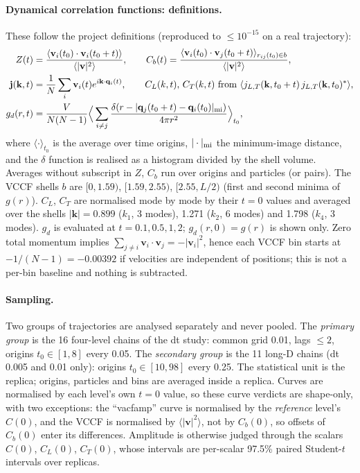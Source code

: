 \documentclass[11pt]{article}
\DeclareRobustCommand{\_}{\textunderscore\allowbreak}
\theoremstyle{remark}
\theoremstyle{definition}
\newcommand{\bq}{\mathbf{q}}
\newcommand{\bk}{\mathbf{k}}
\newcommand{\bv}{\mathbf{v}}
\begin{document}
\paragraph{Dynamical correlation functions: definitions.}
These follow the project definitions (reproduced to $\le10^{-15}$ on a real trajectory):
\begin{align}
Z(t)&=\frac{\langle\bv_i(t_0)\cdot\bv_i(t_0+t)\rangle}{\langle|\bv|^2\rangle},\qquad
C_b(t)=\frac{\langle\bv_i(t_0)\cdot\bv_j(t_0+t)\rangle_{r_{ij}(t_0)\in b}}{\langle|\bv|^2\rangle},\\
\mathbf j(\bk,t)&=\frac1N\sum_i\bv_i(t)e^{i\bk\cdot\bq_i(t)},\qquad
C_{L}(k,t),\,C_T(k,t)\ \text{from}\ \langle j_{L,T}(\bk,t_0+t)\,j_{L,T}(\bk,t_0)^*\rangle,\\
g_d(r,t)&=\frac{V}{N(N-1)}\Big\langle\sum_{i\neq j}\frac{\delta(r-|\bq_j(t_0+t)-\bq_i(t_0)|_{\rm mi})}{4\pi r^2}\Big\rangle_{t_0},
\end{align}
where $\langle\cdot\rangle_{t_0}$ is the average over time origins, $|\cdot|_{\rm mi}$ the minimum-image distance, and the
$\delta$ function is realised as a histogram divided by the shell volume. Averages without subscript in $Z$, $C_b$ run over
origins and particles (or pairs).
The VCCF shells $b$ are $[0,1.59)$, $[1.59,2.55)$, $[2.55,L/2)$ (first and second minima of $g(r)$). $C_L$, $C_T$ are normalised
mode by mode by their $t=0$ values and averaged over the shells $|\bk|=0.899$ ($k_1$, 3 modes), 1.271 ($k_2$, 6 modes) and
1.798 ($k_4$, 3 modes). $g_d$ is evaluated at $t=0.1,0.5,1,2$; $g_d(r,0)=g(r)$ is shown only. Zero total momentum implies
$\sum_{j\neq i}\bv_i\cdot\bv_j=-|\bv_i|^2$, hence each VCCF bin starts at $-1/(N-1)=-0.00392$ if velocities are independent of
positions; this is not a per-bin baseline and nothing is subtracted.

\paragraph{Sampling.} Two groups of trajectories are analysed separately and never pooled.
The \emph{primary group} is the 16 four-level chains of the dt study: common grid 0.01, lags $\le2$, origins $t_0\in[1,8]$ every
0.05. The \emph{secondary group} is the 11 long-D chains (dt 0.005 and 0.01 only): origins $t_0\in[10,98]$ every 0.25. The
statistical unit is the replica; origins, particles and bins are averaged inside a replica. Curves are normalised by each
level's own $t=0$ value, so these curve verdicts are shape-only, with two exceptions: the ``vacf\_amp'' curve is normalised by
the \emph{reference} level's $C(0)$, and the VCCF is normalised by $\langle|\bv|^2\rangle$, not by $C_b(0)$, so offsets of $C_b(0)$ enter
its differences. Amplitude is otherwise judged through the scalars $C(0)$, $C_L(0)$, $C_T(0)$, whose intervals are per-scalar 97.5\%
paired Student-$t$ intervals over replicas.
\end{document}
